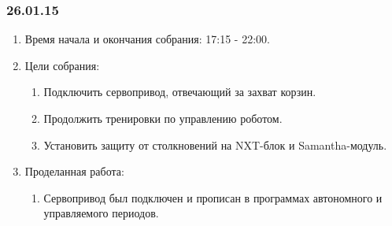 \subsubsection{26.01.15}
\begin{enumerate}
	
	\item Время начала и окончания собрания: 17:15 - 22:00.
	
	\item Цели собрания: 
	\begin{enumerate}
		
		
		\item Подключить сервопривод, отвечающий за захват корзин.
		
		\item Продолжить тренировки по управлению роботом.
		
        \item Установить защиту от столкновений на NXT-блок и Samantha-модуль.
		
	\end{enumerate}

	\item Проделанная работа:
	\begin{enumerate}
		
		\item Сервопривод был подключен и прописан в программах автономного и управляемого периодов.
		

\end{enumerate}
\end{enumerate}
